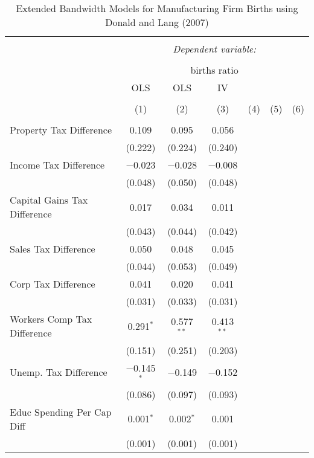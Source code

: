 
\begin{table}[!htbp] \centering 
  \caption{Extended Bandwidth Models for  Manufacturing Firm Births using Donald and Lang (2007)} 
  \label{} 
\begin{tabular}{@{\extracolsep{5pt}}lcccccc} 
\\[-1.8ex]\hline 
\hline \\[-1.8ex] 
 & \multicolumn{6}{c}{\textit{Dependent variable:}} \\ 
\cline{2-7} 
\\[-1.8ex] & \multicolumn{6}{c}{births ratio} \\ 
 & OLS & OLS & IV &  &  &  \\ 
\\[-1.8ex] & (1) & (2) & (3) & (4) & (5) & (6)\\ 
\hline \\[-1.8ex] 
 Property Tax Difference & 0.109 & 0.095 & 0.056 &  &  &  \\ 
  & (0.222) & (0.224) & (0.240) &  &  &  \\ 
  Income Tax Difference & $-$0.023 & $-$0.028 & $-$0.008 &  &  &  \\ 
  & (0.048) & (0.050) & (0.048) &  &  &  \\ 
  Capital Gains Tax Difference & 0.017 & 0.034 & 0.011 &  &  &  \\ 
  & (0.043) & (0.044) & (0.042) &  &  &  \\ 
  Sales Tax Difference & 0.050 & 0.048 & 0.045 &  &  &  \\ 
  & (0.044) & (0.053) & (0.049) &  &  &  \\ 
  Corp Tax Difference & 0.041 & 0.020 & 0.041 &  &  &  \\ 
  & (0.031) & (0.033) & (0.031) &  &  &  \\ 
  Workers Comp Tax Difference & 0.291$^{*}$ & 0.577$^{**}$ & 0.413$^{**}$ &  &  &  \\ 
  & (0.151) & (0.251) & (0.203) &  &  &  \\ 
  Unemp. Tax Difference & $-$0.145$^{*}$ & $-$0.149 & $-$0.152 &  &  &  \\ 
  & (0.086) & (0.097) & (0.093) &  &  &  \\ 
  Educ Spending Per Cap Diff & 0.001$^{*}$ & 0.002$^{*}$ & 0.001 &  &  &  \\ 
  & (0.001) & (0.001) & (0.001) &  &  &  \\ 

\end{tabular}
\end{table}
